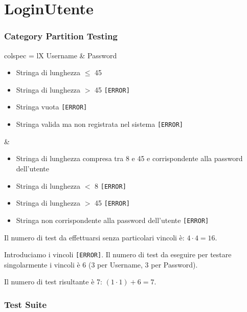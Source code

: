 \section{LoginUtente}

\subsubsection*{Category Partition Testing}

\begin{table}[!hbp]
	\centering
	\footnotesize
	\begin{partest}{colspec = lX}
		Username & Password \\
		\begin{itemize}[leftmargin=*]
			\item Stringa di lunghezza $\leq$ 45
			\item Stringa di lunghezza $>$ 45 \texttt{[ERROR]}
			\item Stringa vuota \texttt{[ERROR]}
			\item Stringa valida ma non registrata nel sistema \texttt{[ERROR]}
		\end{itemize} &
		\begin{itemize}[leftmargin=*]
			\item Stringa di lunghezza compresa tra 8 e 45 e corrispondente alla password dell'utente
			\item Stringa di lunghezza $<$ 8 \texttt{[ERROR]}
			\item Stringa di lunghezza $>$ 45 \texttt{[ERROR]}
			\item Stringa non corrispondente alla password dell'utente \texttt{[ERROR]}
		\end{itemize}
	\end{partest}
\end{table}

\noindent Il numero di test da effettuarsi senza particolari vincoli è: $4 \cdot 4 = 16$.

\noindent Introduciamo i vincoli \texttt{[ERROR]}. Il numero di test da eseguire per testare singolarmente i vincoli è 6 (3 per Username, 3 per Password).

\noindent Il numero di test risultante è 7: $(1 \cdot 1) + 6 = 7$.

\subsubsection*{Test Suite}

